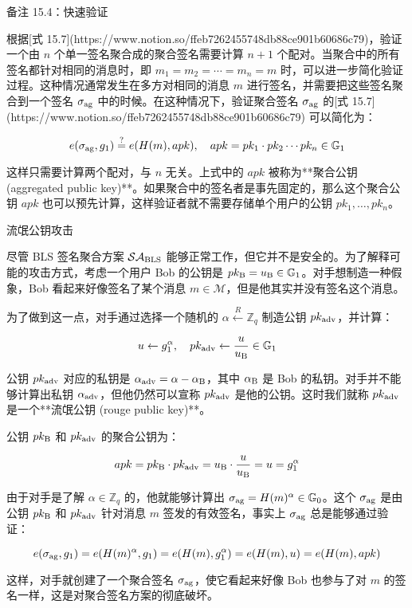 备注 15.4：快速验证

根据[式 15.7](https://www.notion.so/ffeb7262455748db88ce901b60686c79)，验证一个由 $n$ 个单一签名聚合成的聚合签名需要计算 $n+1$ 个配对。当聚合中的所有签名都针对相同的消息时，即 $m_1=m_2=\cdots=m_n=m$ 时，可以进一步简化验证过程。这种情况通常发生在多方对相同的消息 $m$ 进行签名，并需要把这些签名聚合到一个签名 $\sigma_{\rm ag}$ 中的时候。在这种情况下，验证聚合签名 $\sigma_{\rm ag}$ 的[式 15.7](https://www.notion.so/ffeb7262455748db88ce901b60686c79) 可以简化为：

\[
e(\sigma_{\rm ag},g_1)\overset{?}=e(H(m),apk),
\quad
apk=pk_1\cdot pk_2 \cdots pk_n \in \mathbb{G}_1
\]

这样只需要计算两个配对，与 $n$ 无关。上式中的 $apk$ 被称为**聚合公钥 (aggregated public key)**。如果聚合中的签名者是事先固定的，那么这个聚合公钥 $apk$ 也可以预先计算，这样验证者就不需要存储单个用户的公钥 $pk_1,\dots,pk_n$。

流氓公钥攻击

尽管 BLS 签名聚合方案 $\mathcal{SA}_{\rm BLS}$ 能够正常工作，但它并不是安全的。为了解释可能的攻击方式，考虑一个用户 Bob 的公钥是 $pk_{\rm B}=u_{\rm B}\in\mathbb{G}_1$。对手想制造一种假象，Bob 看起来好像签名了某个消息 $m\in \mathcal{M}$，但是他其实并没有签名这个消息。

为了做到这一点，对手通过选择一个随机的 $\alpha \overset{R}\leftarrow \mathbb{Z}_q$ 制造公钥 $pk_{\rm adv}$，并计算：

\[
u\leftarrow g_1^\alpha,
\quad
pk_{\rm adv}\leftarrow \frac{u}{u_{\rm B}}\in\mathbb{G}_1
\]

公钥 $pk_{\rm adv}$ 对应的私钥是 $\alpha_{\rm adv}=\alpha-\alpha_{\rm B}$，其中 $\alpha_{\rm B}$ 是 Bob 的私钥。对手并不能够计算出私钥 $\alpha_{\rm adv}$，但他仍然可以宣称 $pk_{\rm adv}$ 是他的公钥。这时我们就称 $pk_{\rm adv}$ 是一个**流氓公钥 (rouge public key)**。

公钥 $pk_{\rm B}$ 和 $pk_{\rm adv}$ 的聚合公钥为：

\[
apk=pk_{\rm B}\cdot pk_{\rm adv} = u_{\rm B}\cdot\frac{u}{u_{\rm B}} = u = g_1^\alpha
\]

由于对手是了解 $\alpha \in \mathbb{Z}_q$ 的，他就能够计算出 $\sigma_{\rm ag}=H(m)^\alpha \in \mathbb{G}_0$。这个 $\sigma_{\rm ag}$ 是由公钥 $pk_{\rm B}$ 和 $pk_{\rm adv}$ 针对消息 $m$ 签发的有效签名，事实上 $\sigma_{\rm ag}$ 总是能够通过验证：

\[
e(\sigma_{\rm ag},g_1)=e(H(m)^\alpha,g_1)=e(H(m),g_1^\alpha)=e(H(m),u)=e(H(m),apk)
\]

这样，对手就创建了一个聚合签名 $\sigma_{\rm ag}$，使它看起来好像 Bob 也参与了对 $m$ 的签名一样，这是对聚合签名方案的彻底破坏。

